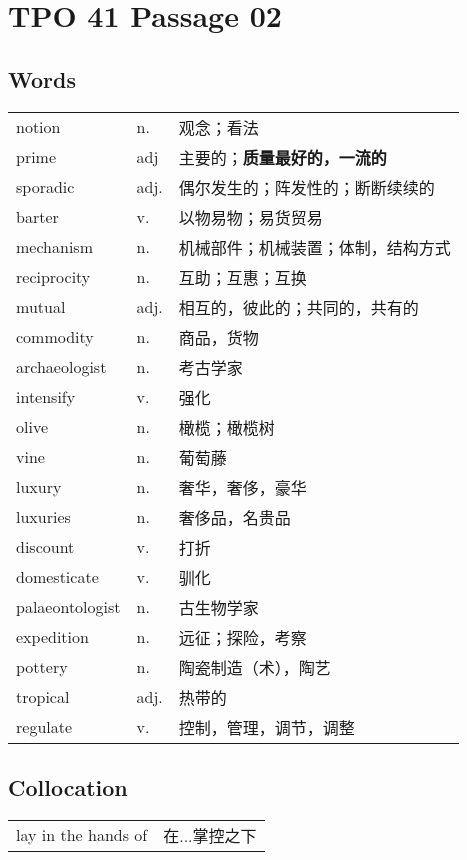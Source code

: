 \section{TPO 41 Passage 02}

\subsection{Words}

\begin{tabular}{lll}
    notion          & n.   & 观念；看法                  \\
    prime           & adj  & 主要的；\textbf{质量最好的，一流的} \\
    sporadic        & adj. & 偶尔发生的；阵发性的；断断续续的       \\
    barter          & v.   & 以物易物；易货贸易              \\
    mechanism       & n.   & 机械部件；机械装置；体制，结构方式      \\
    reciprocity     & n.   & 互助；互惠；互换               \\
    mutual          & adj. & 相互的，彼此的；共同的，共有的        \\
    commodity       & n.   & 商品，货物                  \\
    archaeologist   & n.   & 考古学家                   \\
    intensify       & v.   & 强化                     \\
    olive           & n.   & 橄榄；橄榄树                 \\
    vine            & n.   & 葡萄藤                    \\
    luxury          & n.   & 奢华，奢侈，豪华               \\
    luxuries        & n.   & 奢侈品，名贵品                \\
    discount        & v.   & 打折                     \\
    domesticate     & v.   & 驯化                     \\
    palaeontologist & n.   & 古生物学家                  \\
    expedition      & n.   & 远征；探险，考察               \\
    pottery         & n.   & 陶瓷制造（术），陶艺             \\
    tropical        & adj. & 热带的                    \\
    regulate        & v.   & 控制，管理，调节，调整            \\
\end{tabular}

\subsection{Collocation}

\begin{tabular}{ll}
    lay in the hands of & 在...掌控之下 \\
\end{tabular}
